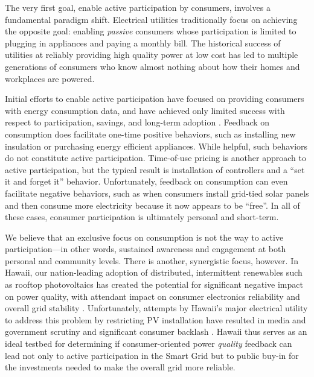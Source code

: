 \documentclass[11pt]{article}
\begin{document}
The very first goal, enable active participation by consumers, involves a fundamental paradigm shift.
Electrical utilities traditionally focus on achieving the opposite goal: enabling {\em passive} 
consumers whose participation is limited to plugging in appliances and paying a monthly bill. The historical success of utilities at reliably providing high quality power at low cost has led to multiple generations of consumers who know almost nothing about how their homes and workplaces are powered.

Initial efforts to enable active participation have focused on providing consumers with energy consumption data, and have achieved only limited success with respect to participation, savings, and long-term adoption \cite{Darby06,Faruqui09,Foster2012}.  Feedback on consumption does facilitate one-time positive behaviors, such as installing new insulation or purchasing energy efficient appliances. While helpful, such behaviors do not constitute active participation.    Time-of-use pricing is another approach to active participation, but the typical result is installation of controllers and a ``set it and forget it'' behavior.  Unfortunately, feedback on consumption can even facilitate negative behaviors, such as when consumers install grid-tied solar panels and then consume more electricity because it now appears to be ``free''.  In all of these cases, consumer participation is ultimately personal and short-term.

We believe that an exclusive focus on consumption is not the way to active participation---in other words, sustained awareness and engagement at both personal and community levels. There is another, synergistic focus, however. In Hawaii, our nation-leading adoption of distributed, intermittent renewables such as rooftop photovoltaics has created the potential for significant negative impact on power quality, with attendant impact on consumer electronics reliability and overall grid stability \cite{Rodriguez2010,Laskar2012}. Unfortunately, attempts by Hawaii's major electrical utility to address this problem by restricting PV installation have resulted in media and government scrutiny and significant consumer backlash \cite{Yonan2013,Zunin2013,Elston2013,Cocke2013,Cocke2012}.  Hawaii thus serves as an ideal testbed for determining if  consumer-oriented power {\em quality} feedback can lead not only to active participation in the Smart Grid but to public buy-in for the investments needed to make the overall grid more reliable.
\end{document}
